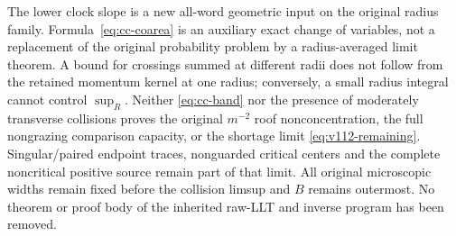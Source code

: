 \begin{remark}
\label{rem:cc-target-boundary}
The lower clock slope is a new all-word geometric input on the
original radius family.  Formula~\eqref{eq:cc-coarea} is an auxiliary
exact change of variables, not a replacement of the original
probability problem by a radius-averaged limit theorem.  A bound for
crossings summed at different radii does not follow from the
retained momentum kernel at one radius; conversely, a small radius
integral cannot control $\sup_R$.  Neither \eqref{eq:cc-band} nor the
presence of moderately transverse collisions proves the original
$m^{-2}$ roof nonconcentration, the full nongrazing comparison
capacity, or the shortage limit \eqref{eq:v112-remaining}.
Singular/paired endpoint traces, nonguarded critical centers and the
complete noncritical positive source remain part of that limit.
All original microscopic widths remain fixed before the collision
limsup and $B$ remains outermost.  No theorem or proof body of the
inherited raw-LLT and inverse program has been removed.
\end{remark}
